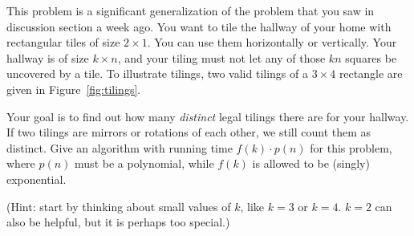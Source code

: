 \documentclass[10pt]{article}
\begin{document}
This problem is a significant generalization of the problem that you saw in discussion section a week ago.
You want to tile the hallway of your home with rectangular tiles of
size $2 \times 1$. You can use them horizontally or vertically.
Your hallway is of size $k \times n$, and your tiling must not let any
of those $kn$ squares be uncovered by a tile.
To illustrate tilings, two valid tilings of a $3 \times 4$ rectangle
are given in Figure~\ref{fig:tilings}.





Your goal is to find out how many \emph{distinct} legal tilings there
are for your hallway.
If two tilings are mirrors or rotations of each other, we still count
them as distinct.
Give an algorithm with running time $f(k) \cdot p(n)$ for this
problem, where $p(n)$ must be a polynomial, while $f(k)$ is allowed to
be (singly) exponential.

(Hint: start by thinking about small values of $k$, like $k=3$ or $k=4$. $k=2$ can also be helpful, but it is perhaps too special.)
\end{document}
